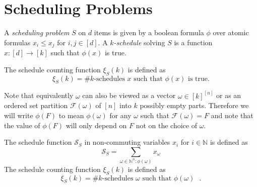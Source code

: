 \documentclass[12pt,reqno]{amsart}
\numberwithin{definition}{section}
\newcommand{\NN}{\mathbb{N}}
\newcommand{\SSS}{\mathcal{S}}
\newcommand{\FFF}{\mathcal{F}}
\newcommand{\defn}[1]{\emph{#1}}
\begin{document}
\section{Scheduling Problems}







A \defn{scheduling problem} $S$ on $d$ items is given by a boolean
formula $\phi$ over atomic formulas $x_i\leq x_j$ for
$i,j\in[d]$.  A \defn{$k$-schedule} solving $S$ is a function
$x:[d]\rightarrow[k]$ such that $\phi(x)$ is true.

The schedule counting function $\xi_S(k)$ is defined as
\[
  \xi_S(k) = \# \text{$k$-schedules $x$ such that $\phi(x)$ is true}.
\]



 Note that
equivalently $\omega$ can also be viewed as a vector $\omega\in
[k]^{[n]}$ or as an ordered set partition $\FFF(\omega)$ of $[n]$ into
$k$ possibly empty parts. Therefore we will write $\phi(F)$ to mean
$\phi(\omega)$ for any $\omega$ such that $\FFF(\omega)=F$ and note
that the value of $\phi(F)$ will only depend on $F$ not on the choice
of $\omega$. 

The schedule function $\SSS_S$ in non-commuting variables
$x_i$ for $i\in \NN$ is defined as
\[
  \SSS_S = \sum_{\omega\in \NN^n: \phi(\omega) } x_\omega
\] 
The schedule counting function $\xi_S(k)$ is defined as
\[
  \xi_S(k) = \# \text{$k$-schedules $\omega$ such that $\phi(\omega)$ }.
\]



\end{document}
